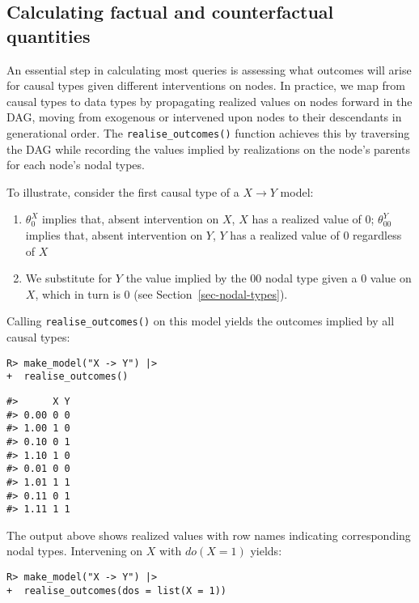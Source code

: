 \documentclass[
  11pt,
  article]{jss}
\providecommand{\tightlist}{%
  \setlength{\itemsep}{0pt}\setlength{\parskip}{0pt}}\usepackage{longtable,booktabs,array}
\begin{document}
\subsection{Calculating factual and counterfactual
quantities}\label{sec-propagation}

An essential step in calculating most queries is assessing what outcomes
will arise for causal types given different interventions on nodes. In
practice, we map from causal types to data types by propagating realized
values on nodes forward in the DAG, moving from exogenous or intervened
upon nodes to their descendants in generational order. The
\texttt{realise\_outcomes()} function achieves this by traversing the
DAG while recording the values implied by realizations on the node's
parents for each node's nodal types.

To illustrate, consider the first causal type of a \(X \rightarrow Y\)
model:

\begin{enumerate}
\def\labelenumi{\arabic{enumi}.}
\tightlist
\item
  \(\theta^X_0\) implies that, absent intervention on \(X\), \(X\) has a
  realized value of \(0\); \(\theta^Y_{00}\) implies that, absent
  intervention on \(Y\), \(Y\) has a realized value of \(0\) regardless
  of \(X\)
\item
  We substitute for \(Y\) the value implied by the \(00\) nodal type
  given a \(0\) value on \(X\), which in turn is \(0\) (see
  Section~\ref{sec-nodal-types}).
\end{enumerate}

Calling \texttt{realise\_outcomes()} on this model yields the outcomes
implied by all causal types:

\begin{verbatim}
R> make_model("X -> Y") |> 
+  realise_outcomes()
\end{verbatim}

\begin{verbatim}
#>      X Y
#> 0.00 0 0
#> 1.00 1 0
#> 0.10 0 1
#> 1.10 1 0
#> 0.01 0 0
#> 1.01 1 1
#> 0.11 0 1
#> 1.11 1 1
\end{verbatim}

The output above shows realized values with row names indicating
corresponding nodal types. Intervening on \(X\)
\citep[see][]{pearl_causality_2009} with \(do(X=1)\) yields:

\begin{verbatim}
R> make_model("X -> Y") |> 
+  realise_outcomes(dos = list(X = 1))
\end{verbatim}
\end{document}
